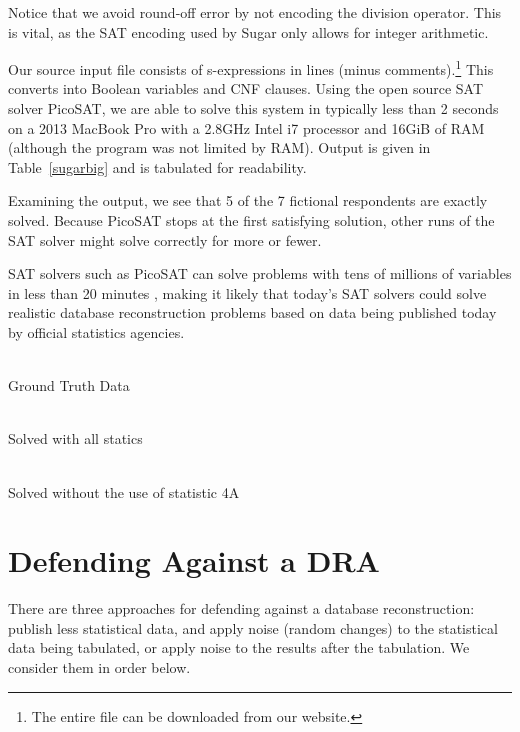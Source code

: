 \documentclass[runningheads]{llncs}
\begin{document}
Notice that we avoid round-off error by not encoding the division
operator. This is vital, as the SAT encoding used by Sugar only allows
for integer arithmetic. 

Our source input file consists of \NumSExpressions s-expressions in \NumConstraintLines{} lines (minus comments).\footnote{The entire file can be downloaded from our website.}
This converts into
\NumVariables Boolean variables and \NumClauses CNF clauses. Using the
open source SAT solver PicoSAT\cite{Biere_picosatessentials}, we are able
to solve this system in typically less than 2 seconds on a 2013 MacBook Pro with a 2.8GHz Intel
i7 processor and 16GiB of RAM (although the program was not limited by
RAM). Output is given in Table~\ref{sugarbig} and is tabulated for readability.

Examining the output, we see that 5 of the 7 fictional respondents are
exactly solved. Because PicoSAT stops at the first satisfying
solution, other runs of the SAT solver might solve correctly for
more or fewer. 

SAT solvers such as PicoSAT can solve problems
with tens of millions of variables in less than 20 minutes
\cite{satcomp}, making it likely that today's SAT solvers could solve
realistic database reconstruction problems based on data being
published today by official statistics agencies.


\begin{table*}
\begin{minipage}[t]{.33\linewidth}
~\\

\caption{Ground Truth Data}
\end{minipage}
\hfill
\begin{minipage}[t]{.33\linewidth}
~\\

\caption{Solved with all statics}
\end{minipage}
\hfill
\begin{minipage}[t]{.33\linewidth}
~\\

\caption{Solved without the use of statistic 4A}
\end{minipage}
\hfill
\end{table*}

\section{Defending Against a DRA}\label{solution}
There are three approaches for defending against a database reconstruction: publish less
statistical data, and apply noise (random changes) to the
statistical data being tabulated, or apply noise to the results after
the tabulation. We consider them in order below.
\end{document}
